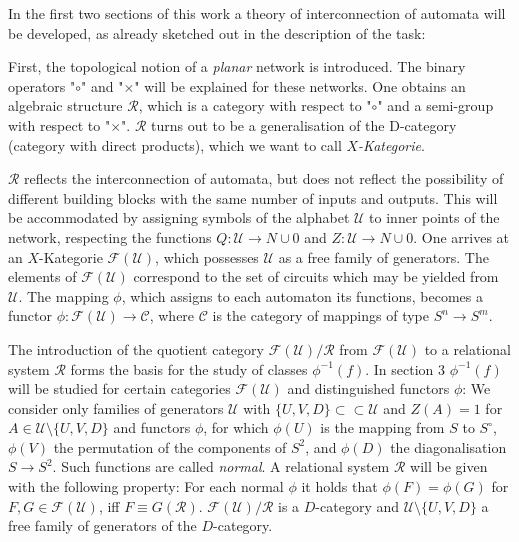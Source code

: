 \documentclass{article}
\begin{document}
In the first two sections of this work a theory of interconnection of automata will be developed, as already sketched out in the description of the task:

First, the topological notion of a \emph{planar} network is introduced. The binary operators "$\circ$" and "$\times$" will be explained for these networks. One obtains an algebraic structure $\mathcal{R}$, which is a category with respect to "$\circ$" and a semi-group with respect to "$\times$". $\mathcal{R}$ turns out to be a generalisation of the D-category (category with direct products), which we want to call \emph{$X$-Kategorie}.

$\mathcal{R}$ reflects the interconnection of automata, but does not reflect the possibility of different building blocks with the same number of inputs and outputs. This will be accommodated by assigning symbols of the alphabet $\mathcal{U}$ to inner points of the network, respecting the functions $Q : \mathcal{U} \rightarrow N \cup {0}$ and $Z : \mathcal{U} \rightarrow N \cup {0}$. One arrives at an $X$-Kategorie $\mathcal{F}(\mathcal{U})$, which possesses $\mathcal{U}$ as a free family of
generators. The elements of $\mathcal{F}(\mathcal{U})$ correspond to the set of circuits which may be yielded from $\mathcal{U}$. The mapping $\phi$, which assigns to each automaton its functions, becomes a functor $\phi:\mathcal{F}(\mathcal{U}) \rightarrow \mathcal{C}$, where $\mathcal{C}$ is the category of mappings of type $S^n \rightarrow S^m$. 

The introduction of the quotient category  $\mathcal{F}(\mathcal{U})/\mathcal{R}$ from $\mathcal{F}(\mathcal{U})$ to a relational system $\mathcal{R}$ forms the basis for the study of classes $\phi^{-1}(f)$. In section 3 $\phi^{-1}(f)$ will be studied for certain categories $\mathcal{F(U)}$ and distinguished functors $\phi$: We consider only families of generators $\mathcal{U}$ with $\{U, V, D\} \subset \subset \mathcal{U}$ and $Z(A) = 1$ for $A\in \mathcal{U} \setminus \{U, V, D\}$ and functors $\phi$, for which $\phi(U)$ is the mapping from $S$
to $S^{\circ}$, $\phi(V)$ the permutation of the components of $S^2$, and $\phi(D)$ the diagonalisation $S \rightarrow S^2$. Such functions are called \emph{normal}. A relational system $\mathcal{R}$ will be given with the following property: For each normal $\phi$ it holds that $\phi(F) = \phi(G)$ for $F, G \in \mathcal{F}(\mathcal{U})$, iff $F\equiv G(\mathcal{R})$. $\mathcal{F}(\mathcal{U})/\mathcal{R}$ is a $D$-category and $\mathcal{U} \setminus \{U, V, D\}$ a free family of generators of the
$D$-category.
\end{document}
